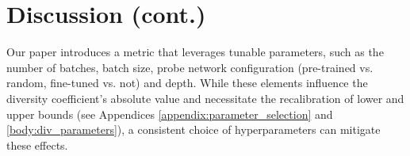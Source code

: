 \section{Discussion (cont.)}
\label{appendix:discussion_cont}

Our paper introduces a metric that leverages tunable parameters, such as the number of batches, batch size, probe network configuration (pre-trained vs. random, fine-tuned vs. not) and depth. 
While these elements influence the diversity coefficient's absolute value and necessitate the recalibration of lower and upper bounds (see Appendices \ref{appendix:parameter_selection} and \ref{body:div_parameters}), a consistent choice of hyperparameters can mitigate these effects. 

